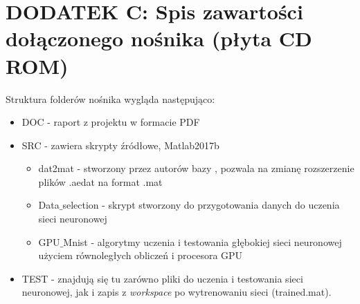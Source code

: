 \section{DODATEK C: Spis zawartości dołączonego nośnika (płyta CD ROM)}
\label{sub:dodatekC}


Struktura folderów nośnika wygląda następująco:
\begin{itemize}
\item DOC - raport z projektu w formacie PDF
\item SRC - zawiera skrypty źródłowe, Matlab2017b
\begin{itemize}
\item dat2mat - stworzony przez autorów bazy \cite{MNIST_DVS}, pozwala na zmianę rozszerzenie plików .aedat na format .mat
\item Data$\_$selection - skrypt stworzony do przygotowania danych do uczenia sieci neuronowej
\item GPU$\_$Mnist - algorytmy uczenia i testowania głębokiej sieci neuronowej użyciem równoległych obliczeń i procesora GPU
\end{itemize}

\item TEST - znajdują się tu zarówno pliki do uczenia i testowania sieci neuronowej, jak i zapis z \textit{workspace} po wytrenowaniu sieci (trained.mat).
\end{itemize}